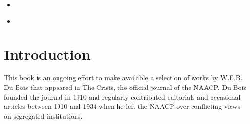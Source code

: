 \documentclass[letterpaper,10pt,english]{jupyterBook}
\begin{document}
\begin{itemize}
\begin{itemize}
\begin{itemize}
\item {} 
\sphinxAtStartPar
{\hyperref[\detokenize{Volumes/40/10/church_and_religion::doc}]{}}

\item {} 
\sphinxAtStartPar
{\hyperref[\detokenize{Volumes/40/11/panafrica_and_new_racial_philosophy::doc}]{}}

\item {} 
\sphinxAtStartPar
{\hyperref[\detokenize{Volumes/40/12/matter_of_manners::doc}]{}}

\item {} 
\sphinxAtStartPar
{\hyperref[\detokenize{Volumes/40/12/peace::doc}]{}}

\item {} 
\sphinxAtStartPar
{\hyperref[\detokenize{Volumes/41/01/scottsboro::doc}]{}}

\end{itemize}

\end{itemize}

\item {} 
\sphinxAtStartPar
{\hyperref[\detokenize{additional_resources::doc}]{}}

\item {} 
\sphinxAtStartPar
{\hyperref[\detokenize{covers::doc}]{}}

\end{itemize}

\sphinxAtStartPar
{}


\chapter{Introduction}
\label{\detokenize{introduction:introduction}}\label{\detokenize{introduction::doc}}
\sphinxAtStartPar
This book is an ongoing effort to make available a selection of works by W.E.B. Du Bois that appeared in The Crisis, the official journal of the NAACP. Du Bois founded the journal in 1910 and regularly contributed editorials and occasional articles between 1910 and 1934 when he left the NAACP over conflicting views on segregated institutions.
\end{document}
